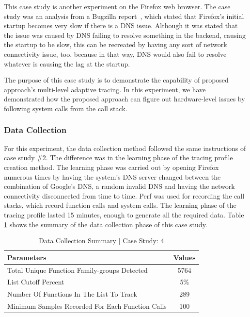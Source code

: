 \documentclass[pdflatex,sn-nature]{sn-jnl}%
\theoremstyle{thmstyleone}%
\theoremstyle{thmstyletwo}%
\theoremstyle{thmstylethree}%
\begin{document}
This case study is another experiment on the Firefox web browser. The case study was an analysis from a Bugzilla report~\cite{cook-2022}, which stated that Firefox's initial startup becomes very slow if there is a DNS issue. Although it was stated that the issue was caused by DNS failing to resolve something in the backend, causing the startup to be slow, this can be recreated by having any sort of network connectivity issue, too, because in that way, DNS would also fail to resolve whatever is causing the lag at the startup.

The purpose of this case study is to demonstrate the capability of proposed approach's multi-level adaptive tracing. In this experiment, we have demonstrated how the proposed approach can figure out hardware-level issues by following system calls from the call stack.


\subsubsection{Data Collection}
For this experiment, the data collection method followed the same instructions of case study \#2. The difference was in the learning phase of the tracing profile creation method. The learning phase was carried out by opening Firefox numerous times by having the system's DNS server changed between the combination of Google's DNS, a random invalid DNS and having the network connectivity disconnected from time to time. Perf was used for recording the call stacks, which record function calls and system calls. The learning phase of the tracing profile lasted 15 minutes, enough to generate all the required data. Table \ref{tabledatacollectioncs4} shows the summary of the data collection phase of this case study.

\begin{table}[tbp]

\centering
\begin{tabular}{ |l|c| }
\hline
\textbf{Parameters} & \textbf{Values} \\
\hline
Total Unique Function Family-groups Detected & 5764 \\
\hline
List Cutoff Percent & 5\% \\
\hline
Number Of Functions In The List To Track & 289 \\
\hline
Minimum Samples Recorded For Each Function Calls & 100 \\
\hline
\end{tabular}%
\caption{Data Collection Summary | Case Study: 4}
\label{tabledatacollectioncs4}
\end{table}
\end{document}
